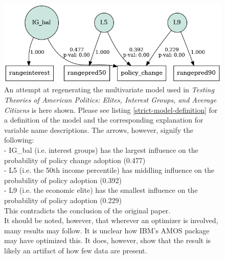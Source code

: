 \documentclass[]{article}
\begin{document}
\begin{figure}[H]
	\begin{center}
		\includegraphics[width=\linewidth]{./figures/generated/multivariate-analysis/strict-regen-multivariate-correlation.png}
	\end{center}
	\caption{An attempt at regenerating the multivariate model used in \textit{Testing Theories of American Politics: Elites, Interest Groups, and Average Citizens} is here shown. Please see listing \ref{strict-model-definition} for a definition of the model and the corresponding explanation for variable name descriptions. The arrows, however, signify the following:\\ - IG\_bal (i.e. interest groups) has the largest influence on the probability of policy change adoption (0.477)\\- L5 (i.e. the 50th income percentile) has middling influence on the probability of policy adoption (0.392)\\- L9 (i.e. the economic elite) has the smallest influence on the probability of policy adoption (0.229)\\This contradicts the conclusion of the original paper.\\It should be noted, however, that wherever an optimizer is involved, many results may follow. It is unclear how IBM's AMOS package may have optimized this. It does, however, show that the result is likely an artifact of how few data are present.}
	\label{strict-regen-multivariate-correlation}
\end{figure}
\end{document}
